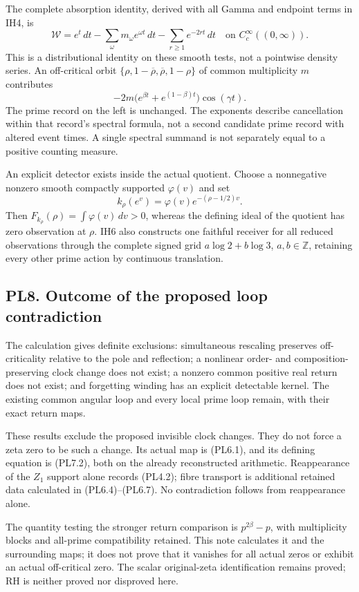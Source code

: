The complete absorption identity, derived with all Gamma and endpoint
terms in IH4, is \[
\mathcal W=e^t\,dt-\sum_\omega m_\omega e^{\omega t}\,dt
-\sum_{r\ge1}e^{-2rt}\,dt
\quad\text{on }C_c^\infty((0,\infty)).
\tag{PL7.3}
\] This is a distributional identity on these smooth tests, not a
pointwise density series. An off-critical orbit
\(\{\rho,1-\overline\rho,\overline\rho,1-\rho\}\) of common multiplicity
\(m\) contributes \[
-2m\bigl(e^{\beta t}+e^{(1-\beta)t}\bigr)\cos(\gamma t).
\tag{PL7.4}
\] The prime record on the left is unchanged. The exponents describe
cancellation within that record's spectral formula, not a second
candidate prime record with altered event times. A single spectral
summand is not separately equal to a positive counting measure.

An explicit detector exists inside the actual quotient. Choose a
nonnegative nonzero smooth compactly supported \(\varphi(v)\) and set \[
k_\rho(e^v)=\varphi(v)e^{-(\rho-1/2)v}.
\] Then \(F_{k_\rho}(\rho)=\int\varphi(v)\,dv>0\), whereas the defining
ideal of the quotient has zero observation at \(\rho\). IH6 also
constructs one faithful receiver for all reduced observations through
the complete signed grid \(a\log2+b\log3\), \(a,b\in\mathbb Z\),
retaining every other prime action by continuous translation.

\subsection{PL8. Outcome of the proposed loop
contradiction}\label{pl8.-outcome-of-the-proposed-loop-contradiction}

The calculation gives definite exclusions: simultaneous rescaling
preserves off-criticality relative to the pole and reflection; a
nonlinear order- and composition-preserving clock change does not exist;
a nonzero common positive real return does not exist; and forgetting
winding has an explicit detectable kernel. The existing common angular
loop and every local prime loop remain, with their exact return maps.

These results exclude the proposed invisible clock changes. They do not
force a zeta zero to be such a change. Its actual map is (PL6.1), and
its defining equation is (PL7.2), both on the already reconstructed
arithmetic. Reappearance of the \(Z_1\) support alone records (PL4.2);
fibre transport is additional retained data calculated in
(PL6.4)--(PL6.7). No contradiction follows from reappearance alone.

The quantity testing the stronger return comparison is \(p^{2\beta}-p\),
with multiplicity blocks and all-prime compatibility retained. This note
calculates it and the surrounding maps; it does not prove that it
vanishes for all actual zeros or exhibit an actual off-critical zero.
The scalar original-zeta identification remains proved; RH is neither
proved nor disproved here.

